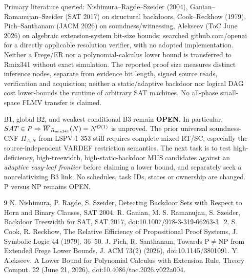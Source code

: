 \documentclass[11pt]{article}
\begin{document}
Primary literature queried: Nishimura--Ragde--Szeider (2004), Ganian--Ramanujan--Szeider (SAT 2017) on structural backdoors, Cook--Reckhow (1979), Pich--Santhanam (JACM 2026) on soundness/witnessing, Alekseev (ToC June 2026) on algebraic extension-system bit-size bounds; searched github.com/openai for a directly applicable resolution verifier, with no adopted implementation. Neither a Frege/ER nor a polynomial-calculus lower bound is transferred to Rmix341 without exact simulation. The reported proof size measures distinct inference nodes, separate from evidence bit length, signed source reads, verification and acquisition; neither a static/adaptive backdoor nor logical DAG cost lower-bounds the runtime of arbitrary SAT machines. No all-phase small-space FLMV transfer is claimed.

B1, global B2, and weakest conditional B3 remain \textbf{OPEN}. In particular, \(SAT\in P\Rightarrow \overline W_{R_{\rm mix341}}(N)=N^{O(1)}\) is unproved. The prior universal soundness-CNF \(H_{A,N}\) from LSPV-1 353 still requires complete mixed RT/SC, especially the source-independent VARDEF restriction semantics. The next task is to test high-deficiency, high-treewidth, high-static-backdoor MUS candidates against an \emph{adaptive easy-leaf frontier} before claiming a lower bound, and separately seek a nonrelativizing B3 link. No schedules, task IDs, states or ownership are changed. P versus NP remains OPEN.

\begin{thebibliography}{9}
 N. Nishimura, P. Ragde, S. Szeider, Detecting Backdoor Sets with Respect to Horn and Binary Clauses, SAT 2004.
 R. Ganian, M. S. Ramanujan, S. Szeider, Backdoor Treewidth for SAT, SAT 2017, doi:10.1007/978-3-319-66263-3\_2.
 S. Cook, R. Reckhow, The Relative Efficiency of Propositional Proof Systems, J. Symbolic Logic 44 (1979), 36--50.
 J. Pich, R. Santhanam, Towards P$\ne$NP from Extended Frege Lower Bounds, J. ACM 73(2) (2026), doi:10.1145/3801091.
 Y. Alekseev, A Lower Bound for Polynomial Calculus with Extension Rule, Theory Comput. 22 (June 21, 2026), doi:10.4086/toc.2026.v022a004.
\end{thebibliography}
\end{document}
